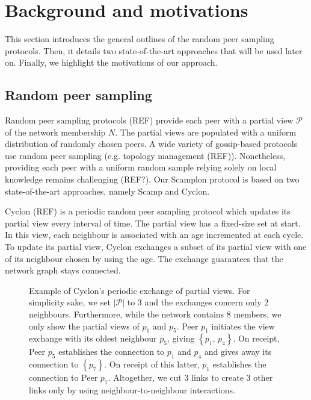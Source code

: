 
\section{Background and motivations}
\label{sec:background}

This section introduces the general outlines of the random peer sampling
protocols. Then, it details two state-of-the-art approaches that will be used
later on. Finally, we highlight the motivations of our approach.

\subsection{Random peer sampling}
Random peer sampling protocols (REF) provide each peer with a partial view
$\mathcal{P}$ of the network membership $N$. The partial views are populated
with a uniform distribution of randomly chosen peers. A wide variety of
gossip-based protocols use random peer sampling (e.g. topology management
(REF)). Nonetheless, providing each peer with a uniform random sample relying
solely on local knowledge remains challenging (REF?).  Our Scamplon protocol is
based on two state-of-the-art approaches, namely Scamp and Cyclon.

\begin{asparadesc}
\item [Cyclon] (REF) is a periodic random peer sampling protocol which updates
  its partial view every interval of time. The partial view has a fixed-size
  set at start. In this view, each neighbour is associated with an age
  incremented at each cycle. To update its partial view, Cyclon exchanges a
  subset of its partial view with one of its neighbour chosen by using the
  age. The exchange guarantees that the network graph stays connected.
\end{asparadesc}

\begin{figure}
  \centering
  
  \caption{\label{fig:cyclonexample}Example of Cyclon's periodic exchange of
    partial views. For simplicity sake, we set $|\mathcal{P}|$ to $3$ and the
    exchanges concern only $2$ neighbours. Furthermore, while the network
    contains $8$ members, we only show the partial views of $p_1$ and $p_5$.
    Peer $p_1$ initiates the view exchange with its oldest neighbour $p_5$,
    giving $\left\{p_1,\,p_4\right\}$. On receipt, Peer $p_5$ establishes the
    connection to $p_1$ and $p_4$ and gives away its connection to
    $\left\{p_7\right\}$.  On receipt of this latter, $p_1$ establishes the
    connection to Peer $p_7$. Altogether, we cut $3$ links to create $3$ other
    links only by using neighbour-to-neighbour interactions.  }
\end{figure}

